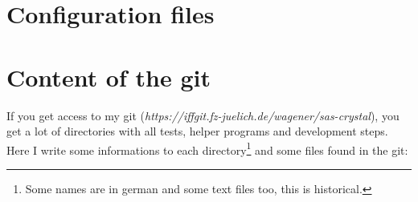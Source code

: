 \documentclass[11pt]{article} %
\begin{document}

\clearpage
\appendix

\section{Configuration files}


\section{Content of the git}

If you get access to my git ({\it https://iffgit.fz-juelich.de/wagener/sas-crystal}), you get a lot of directories with all tests, helper programs and development steps. Here I write some informations to each directory\footnote{Some names are in german and some text files too, this is historical.} and some files found in the git:
\end{document}
